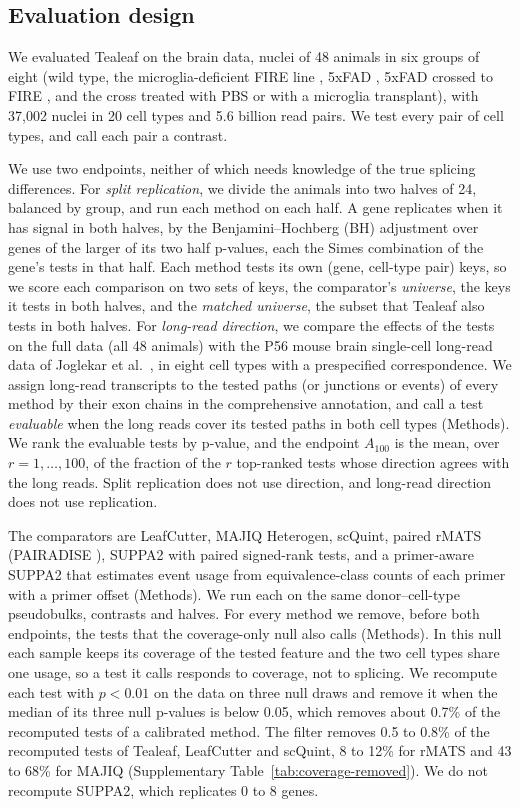 \documentclass[11pt]{article}
\begin{document}
\subsection{Evaluation design}

We evaluated Tealeaf on the brain data, nuclei of 48 animals in six groups of eight (wild type, the microglia-deficient FIRE line \cite{rojo2019}, 5xFAD \cite{oakley2006}, 5xFAD crossed to FIRE \cite{kianishabestari2022}, and the cross treated with PBS or with a microglia transplant), with 37{,}002 nuclei in 20 cell types and 5.6 billion read pairs. We test every pair of cell types, and call each pair a contrast.

We use two endpoints, neither of which needs knowledge of the true splicing differences. For \emph{split replication}, we divide the animals into two halves of 24, balanced by group, and run each method on each half. A gene replicates when it has signal in both halves, by the Benjamini--Hochberg (BH) \cite{benjamini1995} adjustment over genes of the larger of its two half p-values, each the Simes combination of the gene's tests in that half. Each method tests its own (gene, cell-type pair) keys, so we score each comparison on two sets of keys, the comparator's \emph{universe}, the keys it tests in both halves, and the \emph{matched universe}, the subset that Tealeaf also tests in both halves. For \emph{long-read direction}, we compare the effects of the tests on the full data (all 48 animals) with the P56 mouse brain single-cell long-read data of Joglekar et al.\ \cite{joglekar2024}, in eight cell types with a prespecified correspondence. We assign long-read transcripts to the tested paths (or junctions or events) of every method by their exon chains in the comprehensive annotation, and call a test \emph{evaluable} when the long reads cover its tested paths in both cell types (Methods). We rank the evaluable tests by p-value, and the endpoint $A_{100}$ is the mean, over $r=1,\ldots,100$, of the fraction of the $r$ top-ranked tests whose direction agrees with the long reads. Split replication does not use direction, and long-read direction does not use replication.

The comparators are LeafCutter, MAJIQ Heterogen, scQuint, paired rMATS (PAIRADISE \cite{demirdjian2020}), SUPPA2 with paired signed-rank tests, and a primer-aware SUPPA2 that estimates event usage from equivalence-class counts of each primer with a primer offset (Methods). We run each on the same donor--cell-type pseudobulks, contrasts and halves. For every method we remove, before both endpoints, the tests that the coverage-only null also calls (Methods). In this null each sample keeps its coverage of the tested feature and the two cell types share one usage, so a test it calls responds to coverage, not to splicing. We recompute each test with $p<0.01$ on the data on three null draws and remove it when the median of its three null p-values is below 0.05, which removes about 0.7\% of the recomputed tests of a calibrated method. The filter removes 0.5 to 0.8\% of the recomputed tests of Tealeaf, LeafCutter and scQuint, 8 to 12\% for rMATS and 43 to 68\% for MAJIQ (Supplementary Table~\ref{tab:coverage-removed}). We do not recompute SUPPA2, which replicates 0 to 8 genes.
\end{document}
